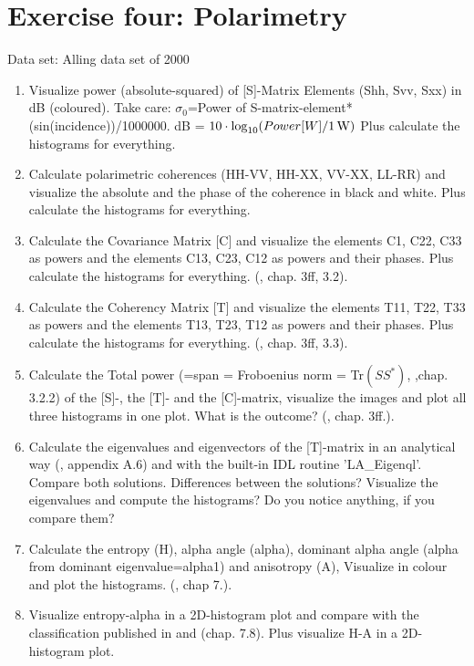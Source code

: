 \newpage
\section{Exercise four: Polarimetry}
Data set: Alling data set of 2000 %
\begin{enumerate}
\item Visualize power (absolute-squared) of [S]-Matrix Elements (Shh, Svv, Sxx) in dB (coloured). Take care: $\sigma_0$=Power of S-matrix-element*(sin(incidence))/1000000. dB = $10\cdot\log_{10}(Power[W]/\unit[1]{W})$  Plus calculate the histograms for everything. 
\item Calculate polarimetric coherences (HH-VV, HH-XX, VV-XX, LL-RR) and visualize the absolute and the phase of the coherence in black and white. Plus calculate the histograms for everything. 
\item Calculate the Covariance Matrix [C] and visualize the elements C1, C22, C33 as powers and the elements C13, C23, C12 as powers and their phases. Plus calculate the histograms for everything. (\cite{PottierB}, chap. 3ff, 3.2).
\item Calculate the Coherency Matrix [T] and visualize the elements T11, T22, T33 as powers and the elements T13, T23, T12 as powers and their phases. Plus calculate the histograms for everything. (\cite{PottierB}, chap. 3ff, 3.3).
\item Calculate the Total power (=span = Froboenius norm = Tr$(SS^*)$, \cite{PottierB},chap. 3.2.2) of the [S]-, the [T]- and the [C]-matrix, visualize the images and plot all three histograms in one plot. What is the outcome? (\cite{PottierB}, chap. 3ff.).
\item Calculate the eigenvalues and eigenvectors of the [T]-matrix in an analytical way (\cite{PottierB}, appendix A.6) and with the built-in IDL routine 'LA\_Eigenql'. Compare both solutions. Differences between the solutions? Visualize the eigenvalues and compute the histograms? Do you notice anything, if you compare them?
\item Calculate the entropy (H), alpha angle (alpha), dominant alpha angle (alpha from dominant eigenvalue=alpha1) and anisotropy (A), Visualize in colour and plot the histograms.  (\cite{PottierB}, chap 7.).
\item Visualize entropy-alpha in a 2D-histogram plot and compare with the classification published in \cite{CloudeP2} and \cite{PottierB} (chap. 7.8). Plus visualize H-A in a 2D-histogram plot. 

\end{enumerate}

